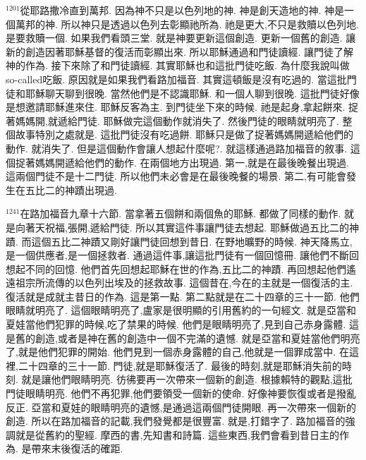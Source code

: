 \documentclass{book}
\begin{document}
$^{1201}$從耶路撒冷直到萬邦.
因為神不只是以色列地的神.
神是創天造地的神.
神是一個萬邦的神.
所以神只是透過以色列去彰顯祂所為.
祂是更大,不只是救贖以色列地.
是要救贖一個.
如果我們看頭三堂.
就是神要更新這個創造.
更新一個舊的創造.
讓新的創造因著耶穌基督的復活而彰顯出來.
所以耶穌通過和門徒讀經.
讓門徒了解神的作為.
接下來除了和門徒讀經.
其實耶穌也和這批門徒吃飯.
為什麼我說叫做so-called吃飯.
原因就是如果我們看路加福音.
其實這頓飯是沒有吃過的.
當這批門徒和耶穌聊天聊到很晚.
當然他們是不認識耶穌.
和一個人聊到很晚.
這批門徒好像是想邀請耶穌進來住.
耶穌反客為主.
到門徒坐下來的時候.
祂是起身,拿起餅來.
捉著媽媽開,就遞給門徒.
耶穌做完這個動作就消失了.
然後門徒的眼睛就明亮了.
整個故事特別之處就是.
這批門徒沒有吃過餅.
耶穌只是做了捉著媽媽開遞給他們的動作.
就消失了.
但是這個動作會讓人想起什麼呢?.
就這樣通過路加福音的敘事.
這個捉著媽媽開遞給他們的動作.
在兩個地方出現過.
第一,就是在最後晚餐出現過.
這兩個門徒不是十二門徒.
所以他們未必會是在最後晚餐的場景.
第二,有可能會發生在五比二的神蹟出現過.

$^{1241}$在路加福音九章十六節.
當拿著五個餅和兩個魚的耶穌.
都做了同樣的動作.
就是向著天祝福,張開,遞給門徒.
所以其實這件事讓門徒去想起.
耶穌做過五比二的神蹟.
而這個五比二神蹟又剛好讓門徒回想到昔日.
在野地曠野的時候.
神天降馬立,是一個供應者,是一個拯救者.
通過這件事,讓這批門徒有一個回憶冊.
讓他們不斷回想起不同的回憶.
他們首先回想起耶穌在世的作為,五比二的神蹟.
再回想起他們遙遠祖宗所流傳的以色列出埃及的拯救故事.
這個昔在,今在的主就是一個復活的主.
復活就是成就主昔日的作為.
這是第一點.
第二點就是在二十四章的三十一節.
他們眼睛就明亮了.
這個眼睛明亮了,盧家是很明顯的引用舊約的一句經文.
就是亞當和夏娃當他們犯罪的時候,吃了禁果的時候.
他們是眼睛明亮了,見到自己赤身露體.
這是舊的創造,或者是神在舊的創造中一個不完滿的遺憾.
就是亞當和夏娃當他們明亮了,就是他們犯罪的開始.
他們見到一個赤身露體的自己,他就是一個罪成當中.
在這裡,二十四章的三十一節.
門徒,就是耶穌復活了.
最後的時刻,就是耶穌消失前的時刻.
就是讓他們眼睛明亮.
彷彿要再一次帶來一個新的創造.
根據賴特的觀點,這批門徒眼睛明亮.
他們不再犯罪,他們要領受一個新的使命.
好像神要恢復或者是撥亂反正.
亞當和夏娃的眼睛明亮的遺憾,是通過這兩個門徒開眼.
再一次帶來一個新的創造.
所以在路加福音的記載,我們發覺都是很豐富.
就是,打錯字了.
路加福音的強調就是從舊約的聖經.
摩西的書,先知書和詩篇.
這些東西,我們會看到昔日主的作為.
是帶來末後復活的確距.
\end{document}

